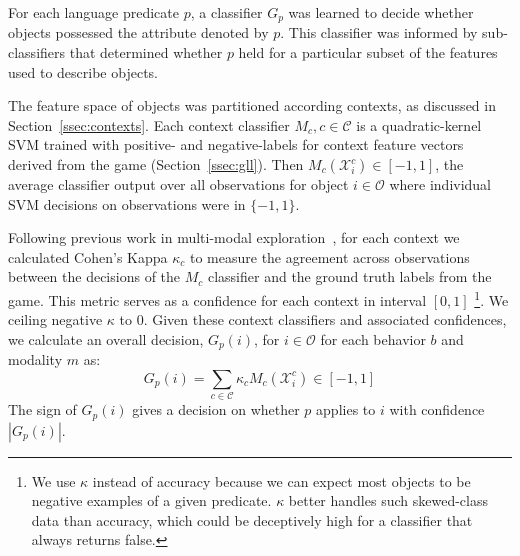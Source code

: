 For each language predicate $p$, a classifier $G_p$ was learned to decide whether objects possessed the attribute denoted by $p$.
This classifier was informed by sub-classifiers that determined whether $p$ held for a particular subset of the features used to describe objects.

The feature space of objects was partitioned according contexts, as discussed in Section~\ref{ssec:contexts}.
Each context classifier $M_{c}, c\in\mathcal{C}$ is a quadratic-kernel SVM trained with positive- and negative-labels for context feature vectors derived from the \ispy game (Section~\ref{ssec:gll}).
Then $M_{c}(\mathcal{X}_i^c)\in [-1,1]$, the average classifier output over all observations for object $i\in\mathcal{O}$ where individual SVM decisions on observations were in $\{-1,1\}$.

Following previous work in multi-modal exploration~\cite{sinapov:icra14}, for each context we calculated Cohen's Kappa $\kappa_{c}$ to measure the agreement across observations between the decisions of the $M_{c}$ classifier and the ground truth labels from the \ispy game. This metric serves as a confidence for each context in interval $[0,1]$ 
\footnote{We use $\kappa$ instead of accuracy because we can expect most objects to be negative examples of a given predicate. $\kappa$ better handles such skewed-class data than accuracy, which could be deceptively high for a classifier that always returns false.}.
We ceiling negative $\kappa$ to $0$.
Given these context classifiers and associated confidences, we calculate an overall decision, $G_p(i)$, for $i\in\mathcal{O}$ for each behavior $b$ and modality $m$ as:
\begin{equation}
	G_p(i) = \sum_{c\in\mathcal{C}}{\kappa_{c} M_{c}(\mathcal{X}_i^c)} \in [-1,1]
\end{equation}
The sign of $G_p(i)$ gives a decision on whether $p$ applies to $i$ with confidence $|G_p(i)|$.
